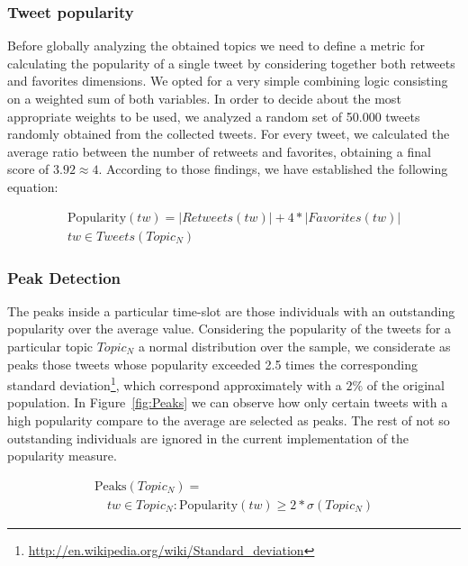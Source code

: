 \documentclass{sig-alternate}
\begin{document}
\subsubsection{Tweet popularity}

Before globally analyzing the obtained topics we need to define a metric for calculating the popularity of a single tweet by considering together both retweets and favorites dimensions. We opted for a very simple combining logic consisting on a weighted sum of both variables. In order to decide about the most appropriate weights to be used, we analyzed a random set of 50.000 tweets randomly obtained from the collected tweets. For every tweet, we calculated the average ratio between the number of retweets and favorites, obtaining a final score of $3.92 \approx 4$. According to those findings, we have established the following equation:

\begin{equation}
\begin{split}
\text{Popularity}(tw) = \left |Retweets(tw)  \right | + 4*\left |Favorites(tw)  \right | \\
tw \in Tweets(Topic_N)
\end{split}
\end{equation}

\subsubsection{Peak Detection}

The peaks inside a particular time-slot are those individuals with an outstanding popularity over the average value. Considering the popularity of the tweets for a particular topic $Topic_N$ a normal distribution over the sample, we considerate as peaks those tweets whose popularity exceeded 2.5 times the corresponding standard deviation\footnote{\fontsize{8pt}{1em}\selectfont \url{http://en.wikipedia.org/wiki/Standard_deviation}}, which correspond approximately with a $2\%$ of the original population. In Figure~\ref{fig:Peaks} we can observe how only certain tweets with a high popularity compare to the average are selected as peaks. The rest of not so outstanding individuals are ignored in the current implementation of the popularity measure.

\begin{equation}
\begin{split}
\text{Peaks}(Topic_N) = \\
 \quad tw \in Topic_N : \text{Popularity}(tw) \geq 2*\sigma (Topic_N)
\end{split}
\end{equation}
\end{document}
